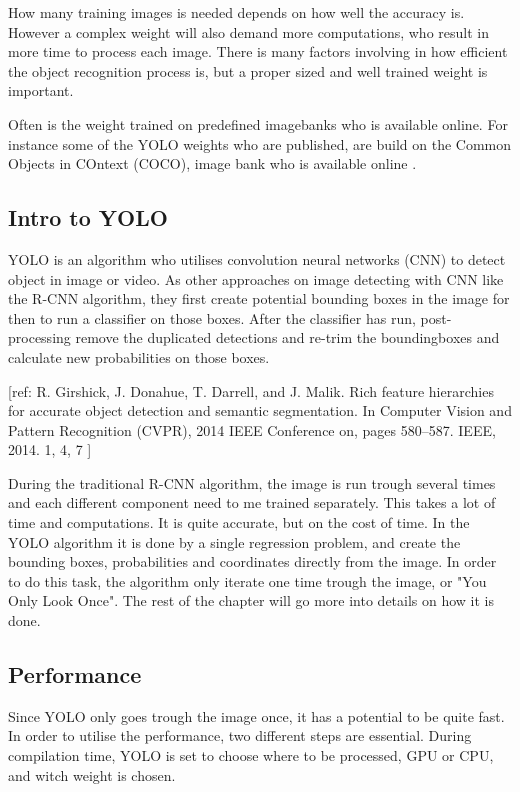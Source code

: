 How many training images is needed depends on how well the accuracy is. However a complex weight will also demand more computations, who result in more time to process each image. There is many factors involving in how efficient the object recognition process is, but a proper sized and well trained weight is important.

Often is the weight trained on predefined imagebanks who is available online. For instance some of the YOLO weights who are published, are build on the Common Objects in COntext (COCO), image bank who is available online \cite{darknet13}.

\subsection{Intro to YOLO}\label{yolo_intro}
YOLO is an algorithm who utilises convolution neural networks (CNN) to detect object in image or video. As other approaches on image detecting with CNN like the R-CNN algorithm, they first create potential bounding boxes in the image for then to run a classifier on those boxes. After the classifier has run, post-processing remove the duplicated detections and re-trim the boundingboxes and calculate new probabilities on those boxes. 

[ref: R. Girshick, J. Donahue, T. Darrell, and J. Malik. Rich feature
hierarchies for accurate object detection and semantic
segmentation. In Computer Vision and Pattern Recognition
(CVPR), 2014 IEEE Conference on, pages 580–587. IEEE,
2014. 1, 4, 7 ]

During the traditional R-CNN algorithm, the image is run trough several times and each different component need to me trained separately. This takes a lot of time and computations. It is quite accurate, but on the cost of time. In the YOLO algorithm it is done by a single regression problem, and create the bounding boxes, probabilities and coordinates directly from the image. In order to do this task, the algorithm only iterate one time trough the image, or "You Only Look Once". The rest of the chapter will go more into details on how it is done.

\subsection{Performance}
Since YOLO only goes trough the image once, it has a potential to be quite fast. In order to utilise the performance, two different steps are essential. During compilation time, YOLO is set to choose where to be processed, GPU or CPU, and witch weight is chosen.

